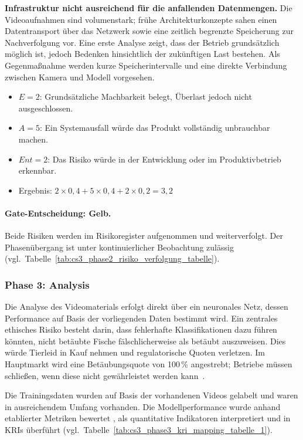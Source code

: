 \textbf{Infrastruktur nicht ausreichend für die anfallenden Datenmengen.}
Die Videoaufnahmen sind volumenstark; frühe Architekturkonzepte sahen einen
Datentransport über das Netzwerk sowie eine zeitlich begrenzte Speicherung zur
Nachverfolgung vor. Eine erste Analyse zeigt, dass der Betrieb grundsätzlich
möglich ist, jedoch Bedenken hinsichtlich der zukünftigen Last bestehen.
Als Gegenmaßnahme werden kurze Speicherintervalle und eine direkte Verbindung
zwischen Kamera und Modell vorgesehen.
\begin{itemize}
    \item $E = 2$: Grundsätzliche Machbarkeit belegt, Überlast jedoch nicht
    ausgeschlossen.
    \item $A = 5$: Ein Systemausfall würde das Produkt vollständig unbrauchbar
    machen.
    \item $Ent = 2$: Das Risiko würde in der Entwicklung oder im Produktivbetrieb
    erkennbar.
    \item Ergebnis: $2 \times 0{,}4 + 5 \times 0{,}4 + 2 \times 0{,}2 = 3{,}2$
\end{itemize}

\paragraph{Gate-Entscheidung: Gelb.}
Beide Risiken werden im Risikoregister aufgenommen und weiterverfolgt.
Der Phasenübergang ist unter kontinuierlicher Beobachtung zulässig
(vgl.\ Tabelle~\ref{tab:cs3_phase2_risiko_verfolgung_tabelle}).

\subsubsection{Phase 3: Analysis}

Die Analyse des Videomaterials erfolgt direkt über ein neuronales Netz, dessen
Performance auf Basis der vorliegenden Daten bestimmt wird. Ein zentrales ethisches
Risiko besteht darin, dass fehlerhafte Klassifikationen dazu führen könnten,
nicht betäubte Fische fälschlicherweise als betäubt auszuweisen. Dies würde
Tierleid in Kauf nehmen und regulatorische Quoten verletzen. Im Hauptmarkt
wird eine Betäubungsquote von 100\,\% angestrebt; Betriebe müssen schließen,
wenn diese nicht gewährleistet werden kann~\citep{espmark_assessment_2025}.

Die Trainingsdaten wurden auf Basis der vorhandenen Videos gelabelt und waren
in ausreichendem Umfang vorhanden. Die Modellperformance wurde anhand
etablierter Metriken bewertet \citep{aliferis_overfitting_2024, mehrabi_survey_2022, pelosi_explainability_2025}, als quantitative Indikatoren interpretiert und in KRIs überführt
(vgl.\ Tabelle~\ref{tab:cs3_phase3_kri_mapping_tabelle_1}).

